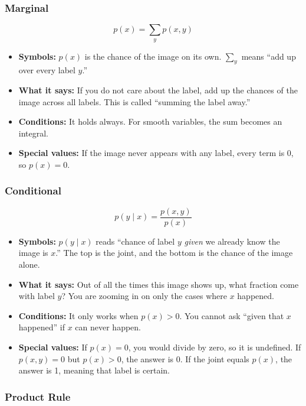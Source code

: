 \subsubsection*{Marginal}

\[
p(x) = \sum_y p(x, y)
\]

\begin{itemize}
  \item \textbf{Symbols:} $p(x)$ is the chance of the image on its own. $\sum_y$ means ``add up over every label $y$.''
  \item \textbf{What it says:} If you do not care about the label, add up the chances of the image across all labels. This is called ``summing the label away.''
  \item \textbf{Conditions:} It holds always. For smooth variables, the sum becomes an integral.
  \item \textbf{Special values:} If the image never appears with any label, every term is 0, so $p(x) = 0$.
\end{itemize}

\subsubsection*{Conditional}

\[
p(y \mid x) = \frac{p(x, y)}{p(x)}
\]

\begin{itemize}
  \item \textbf{Symbols:} $p(y \mid x)$ reads ``chance of label $y$ \textit{given} we already know the image is $x$.'' The top is the joint, and the bottom is the chance of the image alone.
  \item \textbf{What it says:} Out of all the times this image shows up, what fraction come with label $y$? You are zooming in on only the cases where $x$ happened.
  \item \textbf{Conditions:} It only works when $p(x) > 0$. You cannot ask ``given that $x$ happened'' if $x$ can never happen.
  \item \textbf{Special values:} If $p(x) = 0$, you would divide by zero, so it is undefined. If $p(x, y) = 0$ but $p(x) > 0$, the answer is 0. If the joint equals $p(x)$, the answer is 1, meaning that label is certain.
\end{itemize}

\subsubsection*{Product Rule}

